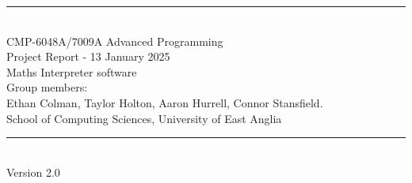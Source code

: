 \documentclass[a4paper, oneside, 11pt]{report}
\begin{document}
    \begin{titlepage}
        \begin{center}
            \rule{12cm}{1mm} \\
            \vspace{1cm}
            {\large  CMP-6048A/7009A Advanced Programming} %
            \vspace{7.5cm}
            \\{\Large Project Report - 13 January 2025}
            \vspace{1.5cm}
            \\{\LARGE Maths Interpreter software} %
            \vspace{1.0cm}
            \\{\Large Group members: \\ Ethan Colman, Taylor Holton, Aaron Hurrell, Connor Stansfield.\ }
            \vspace{10.0cm}
            \\{\large School of Computing Sciences, University of East Anglia}
            \\ \rule{12cm}{0.5mm}
            \\ \hspace{8.5cm} {\large Version 2.0}
        \end{center}
    \end{titlepage}


    \setcounter{page}{1}
\end{document}
